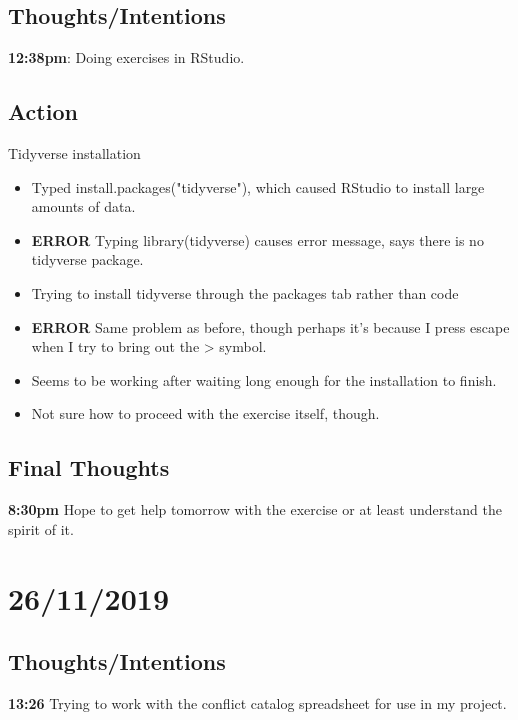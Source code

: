 \documentclass{article}
\begin{document}
\subsection{Thoughts/Intentions}
\textbf{12:38pm}:  Doing exercises in RStudio.

\subsection{Action}

Tidyverse installation 
\begin{itemize}
\item Typed install.packages("tidyverse"), which caused RStudio to install large amounts of data.
\item \textbf{ERROR} Typing library(tidyverse) causes error message, says there is no tidyverse package.
\item Trying to install tidyverse through the packages tab rather than code
\item \textbf{ERROR} Same problem as before, though perhaps it's because I press escape when I try to bring out the > symbol.
\item Seems to be working after waiting long enough for the installation to finish.
\item Not sure how to proceed with the exercise itself, though.
\end{itemize}

\subsection{Final Thoughts}
\textbf{8:30pm} Hope to get help tomorrow with the exercise or at least understand the spirit of it.

\section{26/11/2019}
\subsection{Thoughts/Intentions}

\textbf{13:26} Trying to work with the conflict catalog spreadsheet for use in my project.
\end{document}
